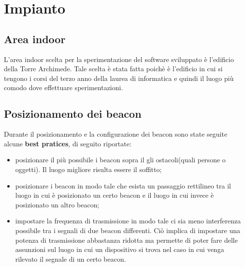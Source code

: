 \documentclass[../DocumentazioneDelloStudio.tex]{subfiles}
\begin{document}
\section{Impianto}
	\subsection{Area indoor}
	L'area indoor scelta per la sperimentazione del software sviluppato è l'edificio della Torre Archimede. Tale scelta è stata fatta poichè è l'edificio in cui si tengono i corsi del terzo anno della laurea di informatica e quindi il luogo più comodo dove effettuare sperimentazioni.

	\subsection{Posizionamento dei beacon}
	Durante il posizionamento e la configurazione dei beacon sono state seguite alcune \textbf{best pratices}, di seguito riportate:
	\begin{itemize}
		\item posizionare il più possibile i beacon sopra il gli ostacoli(quali persone o oggetti). Il luogo migliore risulta essere il soffitto;
		\item posizionare i beacon in modo tale che esista un passaggio rettilineo tra il luogo in cui è posizionato un certo beacon e il luogo in cui invece è posizionato un altro beacon;
		\item impostare la frequenza di trasmissione in modo tale ci sia meno interferenza possibile tra i segnali di due beacon differenti. Ciò implica di impostare una potenza di trasmissione abbastanza ridotta ma permette di poter fare delle assunzioni sul luogo in cui un dispositivo si trova nel caso in cui venga rilevato il segnale di un certo beacon.
	\end{itemize}
\end{document}
